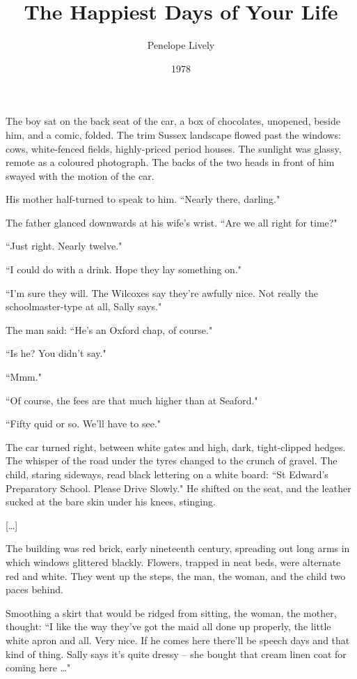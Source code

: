 \documentclass[10pt,a4paper]{article}
\newcommand{\qm}[1]{``#1"}
\begin{document}
\title{The Happiest Days of Your Life}
\date{1978}
\author{Penelope Lively}

\maketitle

\noindent\linenumbers The boy sat on the back seat of the car, a box of chocolates, unopened, beside him, and a comic, folded. The trim Sussex landscape flowed past the windows: cows, white-fenced fields, highly-priced period houses. The sunlight was glassy, remote as a coloured photograph. The backs of the two heads in front of him swayed with the motion of the car.

His mother half-turned to speak to him. \qm{Nearly there, darling.}

The father glanced downwards at his wife's wrist. \qm{Are we all right for time?}

\qm{Just right. Nearly twelve.}

\qm{I could do with a drink. Hope they lay something on.}

\qm{I'm sure they will. The Wilcoxes say they're awfully nice. Not really the schoolmaster-type at all, Sally says.}

The man said: \qm{He's an Oxford chap, of course.}

\qm{Is he? You didn't say.}

\qm{Mmm.}

\qm{Of course, the fees are that much higher than at Seaford.}

\qm{Fifty quid or so. We'll have to see.}

The car turned right, between white gates and high, dark, tight-clipped hedges. The whisper of the road under the tyres changed to the crunch of gravel. The child, staring sideways, read black lettering on a white board: \qm{St Edward's Preparatory School. Please Drive Slowly.} He shifted on the seat, and the leather sucked at the bare skin under his knees, stinging.

[\ldots]

The building was red brick, early nineteenth century, spreading out long arms in which windows glittered blackly. Flowers, trapped in neat beds, were alternate red and white. They went up the steps, the man, the woman, and the child two paces behind.

Smoothing a skirt that would be ridged from sitting, the woman, the mother, thought: \qm{I like the way they've got the maid all done up properly, the little white apron and all. Very nice. If he comes here there'll be speech days and that kind of thing. Sally says it's quite dressy -- she bought that cream linen coat for coming here \ldots{}}
\end{document}
